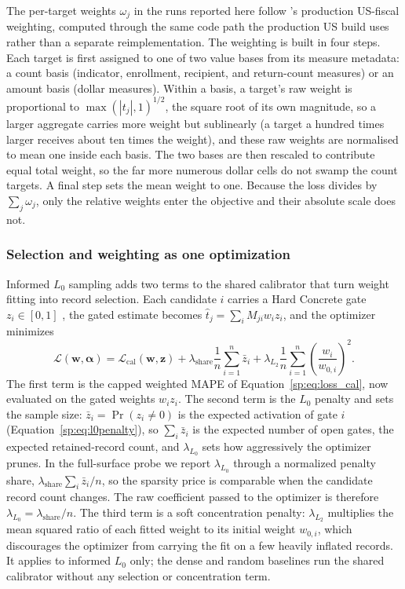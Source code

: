 The per-target weights $\omega_j$ in the runs reported here follow \populace{}'s production US-fiscal
weighting, computed through the same code path the production US build uses rather than a separate
reimplementation. The weighting is built in four steps. Each target is first assigned to one of two
value bases from its measure metadata: a count basis (indicator, enrollment, recipient, and
return-count measures) or an amount basis (dollar measures). Within a basis, a target's raw
weight is proportional to $\max(|t_j|, 1)^{1/2}$, the square root of its own magnitude, so a larger
aggregate carries more weight but sublinearly (a target a hundred times larger receives about ten times
the weight), and these raw weights are normalised to mean one inside each basis. The two bases are then
rescaled to contribute equal total weight, so the far more numerous dollar cells do not swamp the count
targets. A final step sets the mean weight to one. Because the loss divides by $\sum_j \omega_j$, only
the relative weights enter the objective and their absolute scale does not.

\subsubsection{Selection and weighting as one optimization}

Informed $L_0$ sampling adds two terms to the shared calibrator that turn weight fitting into record
selection. Each candidate $i$ carries a Hard Concrete gate $z_i \in [0, 1]$ \citep{louizos2018}, the
gated estimate becomes $\hat{t}_j = \sum_i M_{ji} w_i z_i$, and the optimizer minimizes
\begin{equation}
    \mathcal{L}(\mathbf{w}, \boldsymbol{\alpha}) =
    \mathcal{L}_{\mathrm{cal}}(\mathbf{w}, \mathbf{z}) +
    \lambda_{\mathrm{share}}\frac{1}{n}\sum_{i=1}^{n} \bar{z}_i +
    \lambda_{L_2} \frac{1}{n} \sum_{i=1}^{n} \left(\frac{w_i}{w_{0,i}}\right)^2.
    \label{sp:eq:loss}
\end{equation}
The first term is the capped weighted MAPE of Equation~\ref{sp:eq:loss_cal}, now evaluated on the gated
weights $w_i z_i$. The second term is the $L_0$ penalty and sets the sample size: $\bar{z}_i = \Pr(z_i \neq 0)$ is the
expected activation of gate $i$ (Equation~\ref{sp:eq:l0penalty}), so $\sum_i \bar{z}_i$ is the expected number of open gates, the
expected retained-record count, and $\lambda_{L_0}$ sets how aggressively the optimizer prunes. In the
full-surface probe we report $\lambda_{L_0}$ through a normalized penalty share,
$\lambda_{\mathrm{share}}\sum_i\bar{z}_i/n$, so the sparsity price is comparable when the candidate
record count changes. The raw coefficient passed to the optimizer is therefore
$\lambda_{L_0}=\lambda_{\mathrm{share}}/n$. The third term is a soft concentration penalty: $\lambda_{L_2}$ multiplies the mean squared ratio of each
fitted weight to its initial weight $w_{0,i}$, which discourages the optimizer from carrying the fit on
a few heavily inflated records. It applies to informed $L_0$ only; the dense and random baselines run the
shared calibrator without any selection or concentration term.

